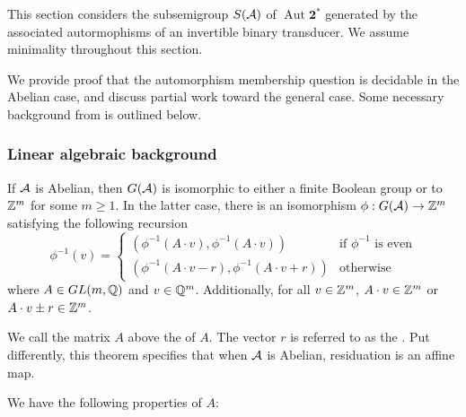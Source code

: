 \documentclass[11pt, titlepage]{article}
\begin{document}
This section considers the subsemigroup $S(\mathcal{A})$ of
$\operatorname{Aut}\textbf{2}^*$ generated by the associated autormophisms of
an invertible binary transducer. We assume minimality throughout this
section.

We provide proof that the automorphism membership question is
decidable in the Abelian case, and discuss partial work toward the
general case. Some necessary background from
\cite{NekrashevychSidki04:automorphisms} is outlined below.

\subsubsection{Linear algebraic background}

\begin{theorem}
  If $\mathcal{A}$ is Abelian, then $G(\mathcal{A})$ is isomorphic to either a finite
  Boolean group or to $\mathbb{Z}^m$ for some $m \geq 1$. In the latter case,
  there is an isomorphism $\phi : G(\mathcal{A}) \rightarrow \mathbb{Z}^m$ satisfying
  the following recursion
\[
  \phi^{-1}(v) =
  \begin{cases}
    (\phi^{-1}(A\cdot v), \phi^{-1}(A \cdot v)) & \text{if $\phi^{-1}$ is even}\\
    (\phi^{-1}(A\cdot v - r), \phi^{-1}(A \cdot v + r)) &
    \text{otherwise}
  \end{cases}
\]
where $A \in GL(m,\mathbb{Q})$ and $v \in \mathbb{Q}^m$. Additionally, for all
$v \in \mathbb{Z}^m$, $A\cdot v \in \mathbb{Z}^m$ or $A\cdot v \pm r \in \mathbb{Z}^m$.
\end{theorem}

We call the matrix $A$ above the  of $A$. The
vector $r$ is referred to as the . Put
differently, this theorem specifies that when $\mathcal{A}$ is Abelian,
residuation is an affine map.

We have the following properties of $A$:
\end{document}
